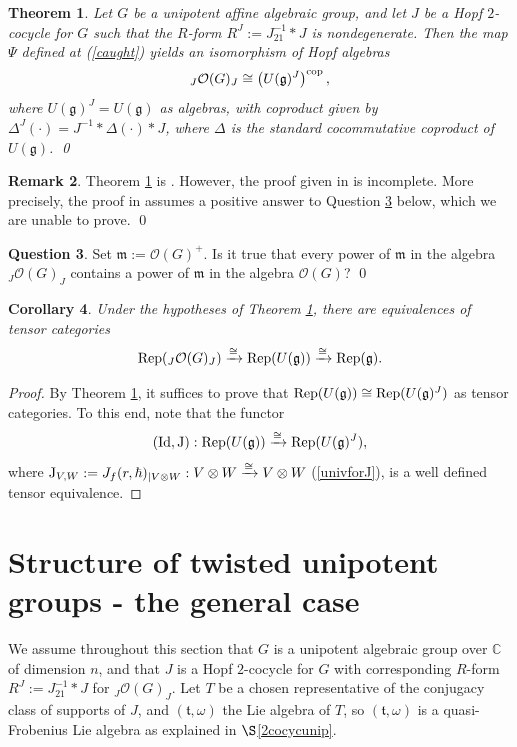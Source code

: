 \documentclass{amsart}
\numberwithin{equation}{section}
\newtheorem{theorem}{Theorem}[section]
\newtheorem{corollary}[theorem]{Corollary}
\theoremstyle{definition}
\newtheorem{question}[theorem]{Question}
\newtheorem{remark}[theorem]{Remark}
\begin{document}
\begin{theorem}\label{minLie} 
Let $G$ be a unipotent affine algebraic group, and let $J$ be a Hopf $2$-cocycle for $G$ such that the $R$-form $R^J := J_{21}^{-1}\ast J$ is nondegenerate. Then the map $\Psi$ defined at (\ref{caught}) yields an isomorphism of Hopf algebras
$${}_J\mathcal{O}(G)_J\cong\left(U(\mathfrak{g})^J\right)^{{\rm cop}},$$
where $U(\mathfrak{g})^J=U(\mathfrak{g})$ as algebras, with coproduct given by $\Delta^J(\cdot)=J^{-1}*\Delta(\cdot)*J$, where $\Delta$ is the standard cocommutative coproduct of $U(\mathfrak{g})$. \qed
\end{theorem}

\begin{remark}\label{compwg22}
Theorem \ref{minLie} is \cite[Theorem 3.4]{G2}. However, the proof given in \cite{G2} is incomplete. More precisely, the proof in \cite{G2} assumes a positive answer to Question \ref{compwg22q} below, which we are unable to prove. \qed
\end{remark}

\begin{question}\label{compwg22q}
Set $\mathfrak{m}:=\mathcal{O}(G)^+$. Is it true that every power of $\mathfrak{m}$ in the algebra ${}_J\mathcal{O}(G)_J$ contains a power of $\mathfrak{m}$ in the algebra $\mathcal{O}(G)$? \qed
\end{question}

\begin{corollary}\label{teneqvrepcat}
Under the hypotheses of Theorem \ref{minLie}, there are equivalences of tensor categories 
$${\rm Rep}({}_J\mathcal{O}(G)_J)\xrightarrow{\cong}{\rm Rep}(U(\mathfrak{g}))\xrightarrow{\cong}{\rm Rep}(\mathfrak{g}).$$
\end{corollary}

\begin{proof}
By Theorem \ref{minLie}, it suffices to prove that ${\rm Rep}(U(\mathfrak{g}))\cong{\rm Rep}(U(\mathfrak{g})^J)$ as tensor categories.
To this end, note that the functor 
$$\left({\rm Id},{\rm J}\right):{\rm Rep}(U(\mathfrak{g}))\xrightarrow{\cong}{\rm Rep}(U(\mathfrak{g})^J),$$
where ${\rm J}_{V,W}:=J_f(r,\hbar)_{\mid V\otimes W}:V\otimes W\xrightarrow{\cong}V\otimes W$ (\ref{univforJ}), is a well defined tensor equivalence.
\end{proof}

\section{Structure of twisted unipotent groups - the general case}\label{structure2} We assume throughout this section that $G$ is a unipotent algebraic group over $\mathbb{C}$ of dimension $n$, and that $J$ is a Hopf $2$-cocycle for $G$ with corresponding $R$-form $R^J := J_{21}^{-1}*J$ for ${}_J\mathcal{O}(G)_J$. Let $T$ be a chosen representative of the conjugacy class of supports of $J$, and $(\mathfrak{t}, \omega)$ the Lie algebra of $T$, so $(\mathfrak{t},\omega)$ is a quasi-Frobenius Lie algebra as explained in $\S$\ref{2cocycunip}.
\end{document}

